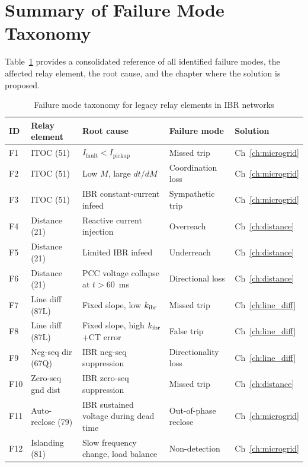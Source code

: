 \section{Summary of Failure Mode Taxonomy}
\label{sec:ch3_taxonomy}

Table~\ref{tab:ch3_failure_modes} provides a consolidated reference of all
identified failure modes, the affected relay element, the root cause,
and the chapter where the solution is proposed.

\begin{table}[htbp]
\caption{Failure mode taxonomy for legacy relay elements in IBR networks}
\label{tab:ch3_failure_modes}
\small
\begin{tabularx}{\textwidth}{@{}lp{2.5cm}p{4.5cm}p{2.5cm}l@{}}
\toprule
ID & Relay element & Root cause & Failure mode & Solution \\
\midrule
F1 & ITOC (51) & $I_\mathrm{fault} < I_\mathrm{pickup}$ & Missed trip & Ch~\ref{ch:microgrid} \\
F2 & ITOC (51) & Low $M$, large $dt/dM$ & Coordination loss & Ch~\ref{ch:microgrid} \\
F3 & ITOC (51) & IBR constant-current infeed & Sympathetic trip & Ch~\ref{ch:microgrid} \\
F4 & Distance (21) & Reactive current injection & Overreach & Ch~\ref{ch:distance} \\
F5 & Distance (21) & Limited IBR infeed & Underreach & Ch~\ref{ch:distance} \\
F6 & Distance (21) & PCC voltage collapse at $t > 60$~ms & Directional loss & Ch~\ref{ch:distance} \\
F7 & Line diff (87L) & Fixed slope, low $k_{\mathrm{ibr}}$ & Missed trip & Ch~\ref{ch:line_diff} \\
F8 & Line diff (87L) & Fixed slope, high $k_{\mathrm{ibr}}$+CT error & False trip & Ch~\ref{ch:line_diff} \\
F9 & Neg-seq dir (67Q) & IBR neg-seq suppression & Directionality loss & Ch~\ref{ch:line_diff} \\
F10 & Zero-seq gnd dist & IBR zero-seq suppression & Missed trip & Ch~\ref{ch:distance} \\
F11 & Auto-reclose (79) & IBR sustained voltage during dead time & Out-of-phase reclose & Ch~\ref{ch:microgrid} \\
F12 & Islanding (81) & Slow frequency change, load balance & Non-detection & Ch~\ref{ch:microgrid} \\
\bottomrule
\end{tabularx}
\end{table}

